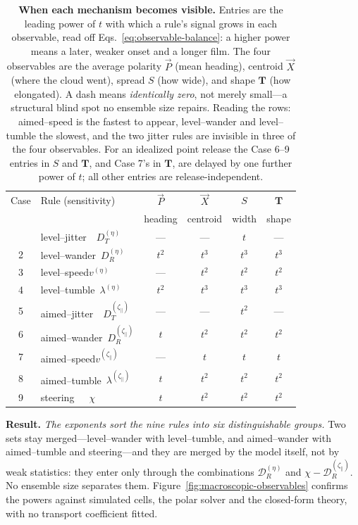 \documentclass[
  reprint,
  superscriptaddress,
  amsmath,
  amssymb,
  aps,
  pre,
  nofootinbib,
  floatfix
]{revtex4-2}
\newcommand{\zp}{\zeta_\parallel}
\newcommand{\Pnet}{\vec P}
\newcommand{\Xc}{\vec X}
\newcommand{\Tsh}{\mathbf T}
\begin{document}
\begin{table}[t]
\caption{\textbf{When each mechanism becomes visible.}  Entries are the
leading power of $t$ with which a rule's signal grows in each observable, read
off Eqs.~\eqref{eq:observable-balance}: a higher power means a later, weaker
onset and a longer film.  The four observables are the average polarity $\Pnet$
(mean heading), centroid $\Xc$ (where the cloud went), spread $S$ (how wide),
and shape $\Tsh$ (how elongated).  A dash means \emph{identically zero}, not
merely small---a structural blind spot no ensemble size repairs.  Reading the
rows: aimed--speed is the fastest to appear, level--wander and level--tumble
the slowest, and the two jitter rules are invisible in three of the four
observables.  For an idealized point release the Case 6--9 entries in $S$ and
$\Tsh$, and Case 7's in $\Tsh$, are delayed by one further power of $t$; all
other entries are release-independent.}
\label{tab:observable-hierarchy}
\begin{ruledtabular}
\begin{tabular}{@{}cl cccc@{}}
Case & Rule (sensitivity) & $\Pnet$ & $\Xc$ & $S$ & $\Tsh$\\
     &                    & heading & centroid & width & shape\\
\colrule
1 & level--jitter\ \ $D_T^{(\eta)}$ & --- & --- & $t$ & ---\\
2 & level--wander\ $D_R^{(\eta)}$ & $t^2$ & $t^3$ & $t^3$ & $t^3$\\
3 & level--speed\quad $v^{(\eta)}$ & --- & $t^2$ & $t^2$ & $t^2$\\
4 & level--tumble\ $\lambda^{(\eta)}$ & $t^2$ & $t^3$ & $t^3$ & $t^3$\\
5 & aimed--jitter\ \ $D_T^{(\zp)}$ & --- & --- & $t^2$ & ---\\
6 & aimed--wander\ $D_R^{(\zp)}$ & $t$ & $t^2$ & $t^2$ & $t^2$\\
7 & aimed--speed\quad $v^{(\zp)}$ & --- & $t$ & $t$ & $t$\\
8 & aimed--tumble\ $\lambda^{(\zp)}$ & $t$ & $t^2$ & $t^2$ & $t^2$\\
9 & steering\qquad\ \ \ $\chi$ & $t$ & $t^2$ & $t^2$ & $t^2$\\
\end{tabular}
\end{ruledtabular}
\end{table}

\textbf{Result.}  \emph{The exponents sort the nine rules into six
distinguishable groups.}  Two sets stay merged---level--wander with
level--tumble, and aimed--wander with aimed--tumble and steering---and they
are merged by the model itself, not by weak statistics: they enter only
through the combinations $\mathcal D_R^{(\eta)}$ and
$\chi-\mathcal D_R^{(\zp)}$.  No ensemble size separates them.
Figure~\ref{fig:macroscopic-observables} confirms the powers against simulated
cells, the polar solver and the closed-form theory, with no transport
coefficient fitted.
\end{document}
